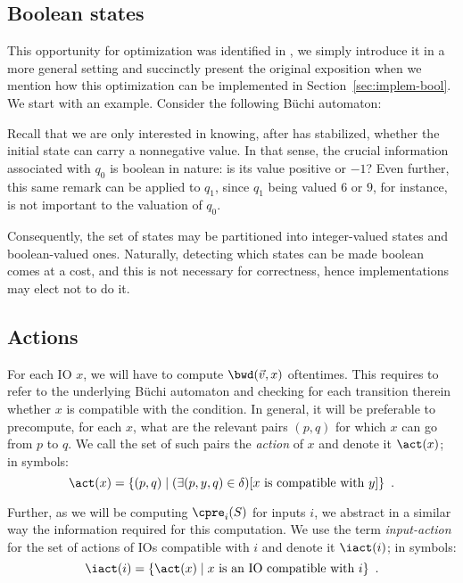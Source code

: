 \documentclass[sigconf,screen]{acmart}
\begin{document}
\subsection{Boolean states}

This opportunity for optimization was identified in \cite{...}, we simply
introduce it in a more general setting and succinctly present the original
exposition when we mention how this optimization can be implemented in
Section~\ref{sec:implem-bool}.  We start with an example.  Consider the
following Büchi automaton:

Recall that we are only interested in knowing, after \cpre has stabilized,
whether the initial state can carry a nonnegative value.  In that sense, the
crucial information associated with \(q_0\) is boolean in nature: is its value
positive or \(-1\)?  Even further, this same remark can be applied to \(q_1\), since
\(q_1\) being valued \(6\) or \(9\), for instance, is not important to the valuation
of \(q_0\).

Consequently, the set of states may be partitioned into integer-valued states
and boolean-valued ones.  Naturally, detecting which states can be made boolean
comes at a cost, and this is not necessary for correctness, hence
implementations may elect not to do it.

\subsection{Actions}

For each IO \(x\), we will have to compute \(\bwd(\vec{v}, x)\) oftentimes.  This
requires to refer to the underlying Büchi automaton and checking for each
transition therein whether \(x\) is compatible with the condition.  In general, it
will be preferable to precompute, for each \(x\), what are the relevant pairs
\((p, q)\) for which \(x\) can go from \(p\) to \(q\).  We call the set of such pairs
the \emph{action} of \(x\) and denote it \(\act(x)\); in symbols:
\[\act(x) = \{(p, q) \mid (\exists (p, y, q) \in \delta)[x \text{ is compatible with }
y]\}\enspace.\]

Further, as we will be computing \(\cpre_i(S)\) for inputs \(i\), we abstract in a
similar way the information required for this computation.  We use the term
\emph{input-action} for the set of actions of IOs compatible with \(i\) and denote
it \(\iact(i)\); in symbols:
\[\iact(i) = \{\act(x) \mid x \text{ is an IO compatible with } i\}\enspace.\]
\end{document}
